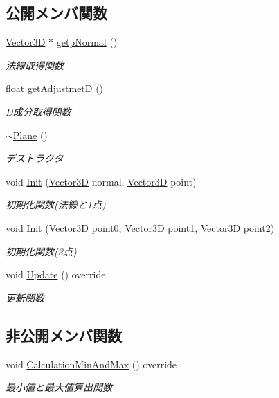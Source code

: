 \subsection*{公開メンバ関数}
\begin{DoxyCompactItemize}
\item 
\mbox{\hyperlink{class_vector3_d}{Vector3D}} $\ast$ \mbox{\hyperlink{class_plane_a8c279383bdaeb247e68c557960eb0c0c}{getp\+Normal}} ()
\begin{DoxyCompactList}\small\item\em 法線取得関数 \end{DoxyCompactList}\item 
float \mbox{\hyperlink{class_plane_a66c47e8798df166c458ca215ed115684}{get\+AdjustmetD}} ()
\begin{DoxyCompactList}\small\item\em D成分取得関数 \end{DoxyCompactList}\item 
\mbox{\hyperlink{class_plane_a69abd86051c880dcb44b249ad10c4436}{$\sim$\+Plane}} ()
\begin{DoxyCompactList}\small\item\em デストラクタ \end{DoxyCompactList}\item 
void \mbox{\hyperlink{class_plane_a2182719af8f880a3871be4cfc33a969b}{Init}} (\mbox{\hyperlink{class_vector3_d}{Vector3D}} normal, \mbox{\hyperlink{class_vector3_d}{Vector3D}} point)
\begin{DoxyCompactList}\small\item\em 初期化関数(法線と1点) \end{DoxyCompactList}\item 
void \mbox{\hyperlink{class_plane_a951041208b47c022ee8955a31baf3507}{Init}} (\mbox{\hyperlink{class_vector3_d}{Vector3D}} point0, \mbox{\hyperlink{class_vector3_d}{Vector3D}} point1, \mbox{\hyperlink{class_vector3_d}{Vector3D}} point2)
\begin{DoxyCompactList}\small\item\em 初期化関数(3点) \end{DoxyCompactList}\item 
void \mbox{\hyperlink{class_plane_a1dd55b527bae8194b21bf2009f53afb0}{Update}} () override
\begin{DoxyCompactList}\small\item\em 更新関数 \end{DoxyCompactList}\end{DoxyCompactItemize}
\subsection*{非公開メンバ関数}
\begin{DoxyCompactItemize}
\item 
void \mbox{\hyperlink{class_plane_a8df0a1a800b32aa21a2a22c7cb52aa86}{Calculation\+Min\+And\+Max}} () override
\begin{DoxyCompactList}\small\item\em 最小値と最大値算出関数 \end{DoxyCompactList}\end{DoxyCompactItemize}
